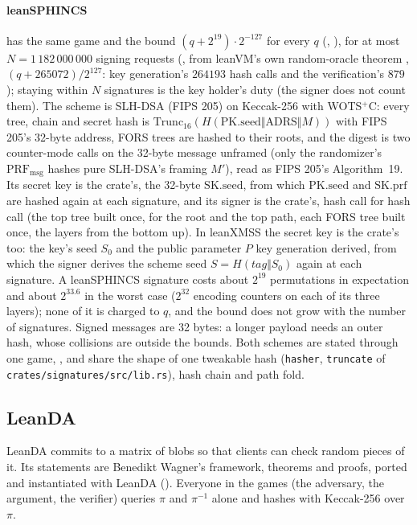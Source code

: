 \documentclass[11pt]{article}
\begin{document}
\paragraph{leanSPHINCS} has the same game and the bound $(q + 2^{19})\cdot 2^{-127}$ for every $q$
(, ), for at most
$N = 1\,182\,000\,000$ signing requests (, from
leanVM's own random-oracle theorem , $(q + 265072)/2^{127}$: key
generation's $264193$ hash calls and the verification's $879$); staying within $N$ signatures is the key holder's duty (the signer does not
count them). The scheme is SLH-DSA (FIPS 205) on Keccak-256 with WOTS$^+$C: every tree, chain and
secret hash is $\mathrm{Trunc}_{16}(H(\mathrm{PK.seed} \Vert \mathrm{ADRS} \Vert M))$ with FIPS 205's
32-byte address, FORS trees are hashed to their roots, and the digest is two counter-mode calls on
the 32-byte message unframed (only the randomizer's $\mathrm{PRF}_{\mathrm{msg}}$ hashes pure
SLH-DSA's framing $M'$), read as FIPS 205's Algorithm~19. Its secret key is the crate's, the
32-byte $\mathrm{SK.seed}$, from which $\mathrm{PK.seed}$ and $\mathrm{SK.prf}$ are hashed again at
each signature, and its signer is the
crate's, hash call for hash call (the top tree built once, for the root and the top path, each FORS
tree built once, the layers from the bottom up). In leanXMSS the secret key is the crate's too: the
key's seed $S_0$ and the public parameter $P$ key generation derived, from which the signer derives
the scheme seed $S = H(\mathit{tag} \Vert S_0)$ again at each signature. A leanSPHINCS signature
costs about $2^{19}$ permutations in expectation and about $2^{33.6}$ in the worst case ($2^{32}$
encoding counters on each of its three layers); none of it is charged to $q$, and the bound does not
grow with the number of signatures. Signed messages are 32 bytes: a longer payload needs an outer
hash, whose collisions are outside the bounds. Both schemes are stated through one game,
,
and share the shape of one tweakable hash (\texttt{hasher}, \texttt{truncate} of
\texttt{crates/signatures/src/lib.rs}), hash chain and path fold.

\subsection*{LeanDA}

LeanDA commits to a matrix of blobs so that clients can check random pieces of it. Its statements are
Benedikt Wagner's framework, theorems and proofs, ported and instantiated with LeanDA
(). Everyone in the games (the adversary, the argument, the verifier)
queries $\pi$ and $\pi^{-1}$ alone and hashes with Keccak-256 over $\pi$.
\end{document}
